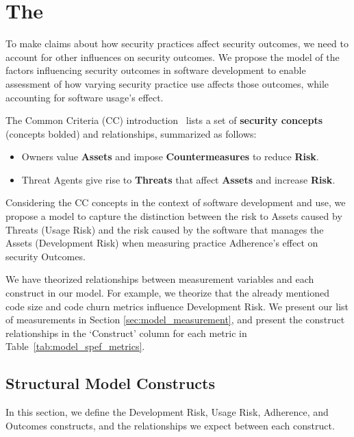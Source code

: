 \section{The \ModelName}
\label{sec:model}
To make claims about how security practices affect security outcomes, we need to account for other influences on security outcomes. We propose the \ModelAbbr model of the factors influencing security outcomes in software development to enable assessment of how varying security practice use affects those outcomes, while accounting for software usage's effect. 
 
 The Common Criteria (CC) introduction~\cite{common2012common} lists a set of \textbf{security concepts} (concepts bolded) and relationships, summarized as follows:
 \begin{itemize}
 	\item  Owners value \textbf{Assets} and  impose \textbf{Countermeasures} to reduce \textbf{Risk}.
 	\item Threat Agents give rise to \textbf{Threats} that affect \textbf{Assets} and increase \textbf{Risk}.
 \end{itemize}
 
 Considering the CC concepts in the context of software development and use, we propose a model to capture the distinction between the risk to Assets caused by Threats (Usage Risk) and the risk caused by the software that manages the Assets (Development Risk)  when measuring practice Adherence's effect on security Outcomes.  

We have theorized relationships between measurement variables and each construct in our model. For example, we theorize that the already mentioned code size and code churn metrics influence Development Risk. We present our list of measurements in Section \ref{sec:model_measurement}, and present the construct relationships in the `Construct' column for each metric in Table~\ref{tab:model_spef_metrics}.

\subsection{Structural Model Constructs}
 \label{sec:model_structual}
In this section, we define the Development Risk, Usage Risk, Adherence, and Outcomes constructs, and the relationships we expect between each construct. 

